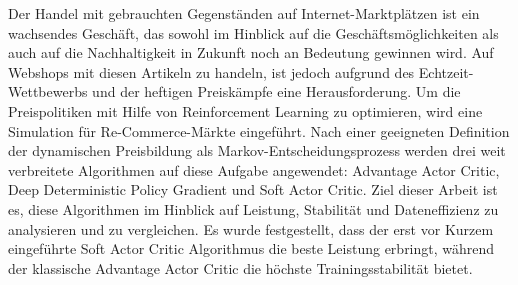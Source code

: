 Der Handel mit gebrauchten Gegenständen auf Internet-Marktplätzen ist ein wachsendes Geschäft, das sowohl im Hinblick auf die Geschäftsmöglichkeiten als auch auf die Nachhaltigkeit in Zukunft noch an Bedeutung gewinnen wird.
Auf Webshops mit diesen Artikeln zu handeln, ist jedoch aufgrund des Echtzeit-Wettbewerbs und der heftigen Preiskämpfe eine Herausforderung.
Um die Preispolitiken mit Hilfe von Reinforcement Learning zu optimieren, wird eine Simulation für Re-Commerce-Märkte eingeführt.
Nach einer geeigneten Definition der dynamischen Preisbildung als Markov-Entscheidungsprozess werden drei weit verbreitete Algorithmen auf diese Aufgabe angewendet:
Advantage Actor Critic, Deep Deterministic Policy Gradient und Soft Actor Critic.
Ziel dieser Arbeit ist es, diese Algorithmen im Hinblick auf Leistung, Stabilität und Dateneffizienz zu analysieren und zu vergleichen.
Es wurde festgestellt, dass der erst vor Kurzem eingeführte Soft Actor Critic Algorithmus die beste Leistung erbringt, während der klassische Advantage Actor Critic die höchste Trainingsstabilität bietet.
